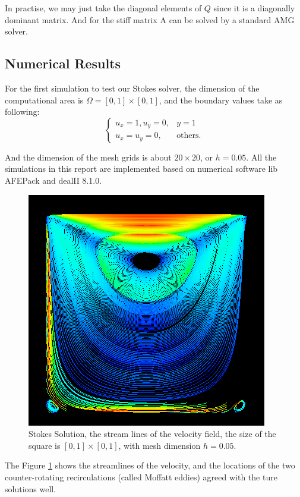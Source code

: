\documentclass[a4paper]{article}
\begin{document}
In practise, we may just take the diagonal elements of $Q$ since it is
a diagonally dominant matrix. And for the stiff matrix A can be solved
by a standard AMG solver.

\subsection{Numerical Results}
For the first simulation to test our Stokes solver, the dimension of
the computational area is $\Omega = [0,1]\times[0,1]$, and the
boundary values take as following:
\begin{equation}
\left\lbrace
\begin{array}{ll}
u_x = 1, u_y = 0, & y = 1 \\
u_x = u_y = 0, & \mbox{others}.
\end{array}
\right.
\label{bd::value1}
\end{equation}

And the dimension of the mesh grids is about $20 \times 20$, or
$h=0.05$. All the simulations in this report are implemented based on
numerical software lib AFEPack and dealII 8.1.0.

\begin{figure}[h]
\centering
\includegraphics[scale = 0.4]{images/Stokes.png}
\caption{Stokes Solution, the stream lines of the velocity field, the
  size of the square is $[0, 1] \times [0, 1]$, with mesh dimension $h = 0.05$.}
\label{im::Stokes-Solution}
\end{figure}

The Figure \ref{im::Stokes-Solution} shows the streamlines of the
velocity, and the locations of the two counter-rotating recirculations
(called Moffatt eddies) agreed with the ture solutions well.
\end{document}
